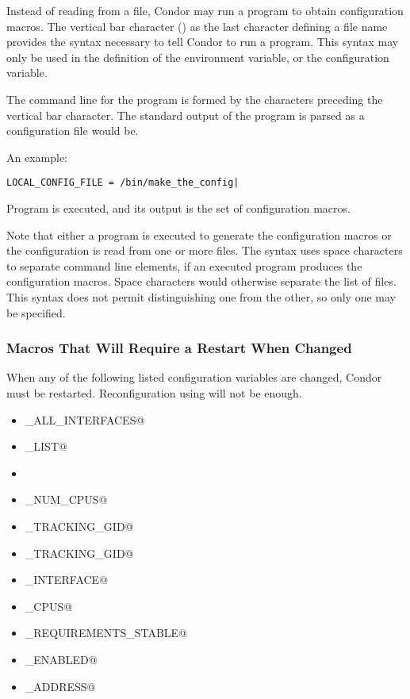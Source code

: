 Instead of reading from a file,
Condor may run a program to obtain configuration macros.
The vertical bar character (\Bar) as the last character defining
a file name provides the syntax necessary to tell 
Condor to run a program.
This syntax may only be used in the definition of
the  environment variable,
or the  configuration variable.

The command line for the program 
is formed by the characters preceding the vertical bar character.
The standard output of the program is parsed as a configuration 
file would be.

An example:
\begin{verbatim}
LOCAL_CONFIG_FILE = /bin/make_the_config|
\end{verbatim}

Program  is executed, and its output
is the set of configuration macros.

Note that either a program is executed to generate the
configuration macros or the configuration is read from 
one or more files.
The syntax uses space characters to separate command line elements,
if an executed program produces the configuration macros.
Space characters would otherwise separate the list of files.
This syntax does not permit distinguishing one from the other,
so only one may be specified.

\subsubsection{\label{sec:Macros-Requiring-Restart}Macros That Will Require a Restart When Changed}
When any of the following listed configuration variables are changed,
Condor must be restarted.
Reconfiguration using  will not be enough.

\begin{itemize}
  \item \verb@BIND_ALL_INTERFACES@
  \item \verb@DAEMON_LIST@
  \item \verb@FetchWorkDelay@
  \item \verb@MAX_NUM_CPUS@
  \item \verb@MAX_TRACKING_GID@
  \item \verb@MIN_TRACKING_GID@
  \item \verb@NETWORK_INTERFACE@
  \item \verb@NUM_CPUS@
  \item \verb@PREEMPTION_REQUIREMENTS_STABLE@
  \item \verb@PRIVSEP_ENABLED@
  \item \verb@PROCD_ADDRESS@
\end{itemize}

